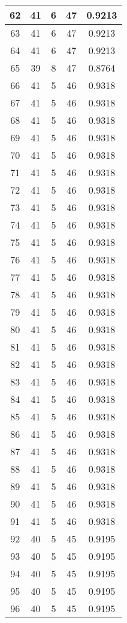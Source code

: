 \documentclass[letterpaper, 12pt]{article}
\begin{document}
\begin{longtable}{|c|c|c|c|c|}
\hline
62 & 41 & 6 & 47 & 0.9213 \\
\hline
63 & 41 & 6 & 47 & 0.9213 \\
\hline
64 & 41 & 6 & 47 & 0.9213 \\
\hline
65 & 39 & 8 & 47 & 0.8764 \\
\hline
66 & 41 & 5 & 46 & 0.9318 \\
\hline
67 & 41 & 5 & 46 & 0.9318 \\
\hline
68 & 41 & 5 & 46 & 0.9318 \\
\hline
69 & 41 & 5 & 46 & 0.9318 \\
\hline
70 & 41 & 5 & 46 & 0.9318 \\
\hline
71 & 41 & 5 & 46 & 0.9318 \\
\hline
72 & 41 & 5 & 46 & 0.9318 \\
\hline
73 & 41 & 5 & 46 & 0.9318 \\
\hline
74 & 41 & 5 & 46 & 0.9318 \\
\hline
75 & 41 & 5 & 46 & 0.9318 \\
\hline
76 & 41 & 5 & 46 & 0.9318 \\
\hline
77 & 41 & 5 & 46 & 0.9318 \\
\hline
78 & 41 & 5 & 46 & 0.9318 \\
\hline
79 & 41 & 5 & 46 & 0.9318 \\
\hline
80 & 41 & 5 & 46 & 0.9318 \\
\hline
81 & 41 & 5 & 46 & 0.9318 \\
\hline
82 & 41 & 5 & 46 & 0.9318 \\
\hline
83 & 41 & 5 & 46 & 0.9318 \\
\hline
84 & 41 & 5 & 46 & 0.9318 \\
\hline
85 & 41 & 5 & 46 & 0.9318 \\
\hline
86 & 41 & 5 & 46 & 0.9318 \\
\hline
87 & 41 & 5 & 46 & 0.9318 \\
\hline
88 & 41 & 5 & 46 & 0.9318 \\
\hline
89 & 41 & 5 & 46 & 0.9318 \\
\hline
90 & 41 & 5 & 46 & 0.9318 \\
\hline
91 & 41 & 5 & 46 & 0.9318 \\
\hline
92 & 40 & 5 & 45 & 0.9195 \\
\hline
93 & 40 & 5 & 45 & 0.9195 \\
\hline
94 & 40 & 5 & 45 & 0.9195 \\
\hline
95 & 40 & 5 & 45 & 0.9195 \\
\hline
96 & 40 & 5 & 45 & 0.9195 \\

\end{longtable}
\end{document}
